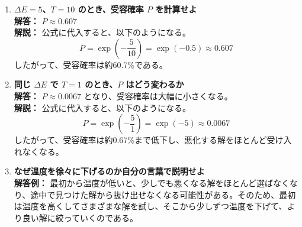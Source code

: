 \documentclass[a4paper,11pt]{jsarticle}
\begin{document}
\begin{enumerate}
    \item \textbf{$\Delta E=5$、$T=10$ のとき、受容確率 $P$ を計算せよ} \\
    \textbf{解答：} $P \approx 0.607$ \\
    \textbf{解説：} 公式に代入すると、以下のようになる。
    \begin{equation*}
        P = \exp\left(-\frac{5}{10}\right) = \exp(-0.5) \approx 0.607
    \end{equation*}
    したがって、受容確率は約60.7\%である。

    \item \textbf{同じ $\Delta E$ で $T=1$ のとき、$P$ はどう変わるか} \\
    \textbf{解答：} $P \approx 0.0067$ となり、受容確率は大幅に小さくなる。 \\
    \textbf{解説：} 公式に代入すると、以下のようになる。
    \begin{equation*}
        P = \exp\left(-\frac{5}{1}\right) = \exp(-5) \approx 0.0067
    \end{equation*}
    したがって、受容確率は約0.67\%まで低下し、悪化する解をほとんど受け入れなくなる。

    \item \textbf{なぜ温度を徐々に下げるのか自分の言葉で説明せよ} \\
    \textbf{解答例：} 最初から温度が低いと、少しでも悪くなる解をほとんど選ばなくなり、途中で見つけた解から抜け出せなくなる可能性がある。そのため、最初は温度を高くしてさまざまな解を試し、そこから少しずつ温度を下げて、より良い解に絞っていくのである。
\end{enumerate}
\end{document}

